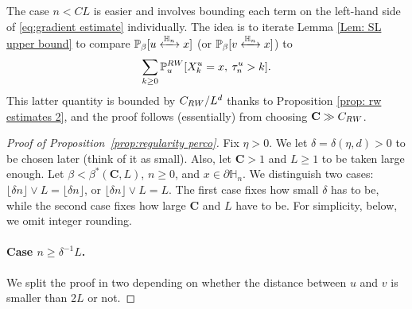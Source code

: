 \documentclass[11pt,a4paper]{article}
\numberwithin{equation}{section}
\theoremstyle{plain}
\theoremstyle{definition}
\newcommand\bfC{\mathbf{C}}
\newcommand{\connect}{\xleftrightarrow}
\begin{document}
 The case $n<CL$ is easier and involves bounding each term on the left-hand side of \eqref{eq:gradient estimate} individually. The idea is to iterate Lemma \ref{Lem: SL upper bound} to compare $\mathbb P_\beta[u\connect{\mathbb H_n\:}x]$ (or $\mathbb P_\beta[v\connect{\mathbb H_n\:}x]$) to 
 \begin{equation} \sum_{k\geq 0}\mathbb P_u^{\rm RW}[X_k^u=x, \: \tau^u_n>k].\end{equation} This latter quantity is bounded by $C_{\rm RW}/L^d$ thanks to Proposition \ref{prop: rw estimates 2}, and the proof follows (essentially) from choosing $\bfC\gg C_{\rm RW}$.
\begin{proof}[Proof of Proposition~\textup{\ref{prop:regularity perco}}] Fix $\eta>0$. We let $\delta=\delta(\eta,d)>0$ to be chosen later (think of it as small). Also, let $\bfC>1$ and $L\geq 1$ to be taken large enough. Let $\beta<\beta^*(\bfC,L)$, $n\geq 0$, and $x\in \partial \mathbb H_n$. We distinguish two cases: $\lfloor \delta n\rfloor \vee L= \lfloor \delta n \rfloor$, or $\lfloor \delta n\rfloor \vee L=L$. The first case fixes how small $\delta$ has to be, while the second case fixes how large $\bfC$ and $L$ have to be. For simplicity, below, we omit integer rounding.
\paragraph{Case $n\geq \delta^{-1}L$.} We split the proof in two depending on whether the distance between $u$ and $v$ is smaller than $2L$ or not.


\end{proof}
\end{document}
